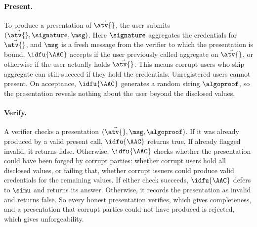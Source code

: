 \paragraph{Present.} To produce a presentation of $\vec{\atv{}}$, the user
submits $(\vec{\atv{}}, \signature, \msg)$. Here
$\signature$ aggregates the credentials for $\vec{\atv{}}$, and $\msg$ is a fresh
message from the verifier to which the presentation is bound.
$\idfu{\AAC}$ accepts if the user previously called aggregate on $\vec{\atv{}}$,
or otherwise if the user actually holds $\vec{\atv{}}$. This means corrupt
users who skip aggregate can still succeed if they hold the credentials.
Unregistered users cannot present. On
acceptance, $\idfu{\AAC}$ generates a random string $\algoproof$, so the
presentation reveals nothing about the user beyond the disclosed values.

\paragraph{Verify.} A verifier checks a presentation
$(\vec{\atv{}}, \msg, \algoproof)$. If it was already produced by a valid
present call, $\idfu{\AAC}$ returns true. If already flagged invalid, it returns
false.  Otherwise, $\idfu{\AAC}$ checks whether the presentation could have been
forged by corrupt parties: whether corrupt users hold all disclosed values, or
failing that, whether corrupt issuers could produce valid credentials for the
remaining values. If either check succeeds, $\idfu{\AAC}$ defers to $\simu$ and
returns its answer. Otherwise, it records the presentation as invalid and
returns false. So every honest presentation
verifies, which gives completeness, and a presentation that corrupt parties
could not have produced is rejected, which gives unforgeability.

